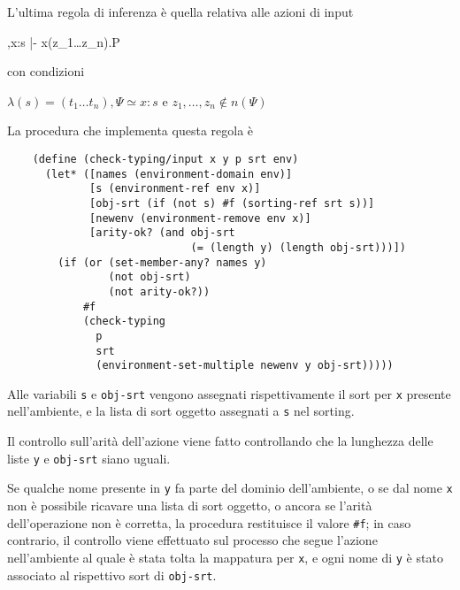 L'ultima regola di inferenza \`e quella relativa alle azioni di input

\begin{pilisting}
      {\Psi,x:s |- x(z_1\ldots z_n).P}
\end{pilisting}

con condizioni

\begin{pilisting}
$
    \lambda(s) = (t_1\ldots t_n),
    \Psi \simeq x : s$ e $z_1,\ldots,z_n \notin n(\Psi)
$
\end{pilisting}

La procedura che implementa questa regola \`e

\begin{lstlisting}
    (define (check-typing/input x y p srt env)
      (let* ([names (environment-domain env)]
             [s (environment-ref env x)]
             [obj-srt (if (not s) #f (sorting-ref srt s))]
             [newenv (environment-remove env x)]
             [arity-ok? (and obj-srt
                             (= (length y) (length obj-srt)))])
        (if (or (set-member-any? names y)
                (not obj-srt)
                (not arity-ok?))
            #f
            (check-typing
              p
              srt
              (environment-set-multiple newenv y obj-srt)))))
\end{lstlisting}

Alle variabili \lstinline{s} e \lstinline{obj-srt} vengono assegnati
rispettivamente il sort per \lstinline{x} presente nell'ambiente, e la
lista di sort oggetto assegnati a \lstinline{s} nel sorting.

Il controllo sull'arit\`a dell'azione viene fatto controllando che la
lunghezza delle liste \lstinline{y} e \lstinline{obj-srt} siano uguali.

Se qualche nome presente in \lstinline{y} fa parte del dominio
dell'ambiente, o se dal nome \lstinline{x} non \`e possibile ricavare
una lista di sort oggetto, o ancora se l'arit\`a dell'operazione non
\`e corretta, la procedura restituisce il valore \lstinline{#f}; in
caso contrario, il controllo viene effettuato sul processo che segue
l'azione nell'ambiente al quale \`e stata tolta la mappatura per
\lstinline{x}, e ogni nome di \lstinline{y} \`e stato associato al
rispettivo sort di \lstinline{obj-srt}.
